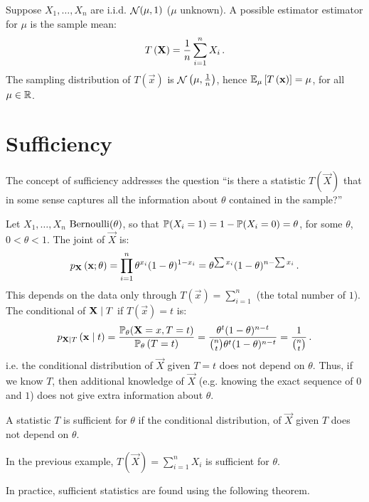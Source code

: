 
\begin{example}
Suppose $X_1, \dotsc, X_n$ are i.i.d. $\mathop{\mathcal{N}}(\mu, 1)$ ($\mu$ unknown). A possible estimator estimator for $\mu$ is the sample mean:
\[
 T\left(\mathbf{X}\right) = \frac{1}{n}\sum_{i=1}^n X_i \, {.}
\]
The sampling distribution of $T\left(\vec{x}\right)$ is $\mathop{\mathcal{N}}\left(\mu, \frac{1}{n}\right)$, hence $\mathbb{E}_\mu \left[ T\left(\mathbf{x}\right) \right] = \mu$, for all $\mu \in \mathbb{R}$.
\end{example}

\section{Sufficiency}
The concept of sufficiency addresses the question ``is there a statistic $T\left(\vec{X}\right)$ that in some sense captures all the information about $\theta$ contained in the sample?''

\begin{example}[label=example:1.2]
Let $X_1, \dotsc, X_n$ \iid $\operatorname{Bernoulli}(\theta)$, so that $\mathbb{P}(X_i = 1) = 1 - \mathbb{P}(X_i = 0) = \theta$, for some $\theta$, $0 < \theta < 1$. The joint \pmf of $\vec{X}$ is:
\[
p_{\mathbf{X}}\left(\mathbf{x}; \theta\right) = \prod_{i = 1}^n \theta^{x_i}(1-\theta)^{1-x_i} = \theta^{\sum x_i}(1 - \theta)^{n - \sum x_i} \, {.}
\]
This depends on the data only through $T\left(\vec{x}\right) = \sum_{i=1}^n$ (the total number of $1$). The conditional \pmf of $\mathbf{X} \mid T$ if $T\left(\vec{x}\right) = t$ is:
\[
p_{\mathbf{X} \mid T} \left( \mathbf{x} \mid t\right) = \frac{\mathbb{P}_\theta(\mathbf{X} = x, T = t)}{\mathbb{P}_\theta\left(T = t\right)} = \frac{\theta^t(1-\theta)^{n-t}}{\binom{n}{t}\theta^t(1-\theta)^{n-t}} = \frac{1}{\binom{n}{t}} \, {.}
\]
i.e. the conditional distribution of $\vec{X}$ given $T = t$ does not depend on $\theta$. Thus, if we know $T$, then additional knowledge of $\vec{X}$ (e.g. knowing the exact sequence of $0$ and $1$) does not give extra information about $\theta$.
\end{example}

\begin{definition}
  A statistic $T$ is sufficient for $\theta$ if the conditional distribution, of $\vec{X}$ given $T$ does not depend on $\theta$.
\end{definition}

In the previous example, $T\left(\vec{X}\right) = \sum_{i=1}^n X_i$ is sufficient for $\theta$.

In practice, sufficient statistics are found using the following theorem.

